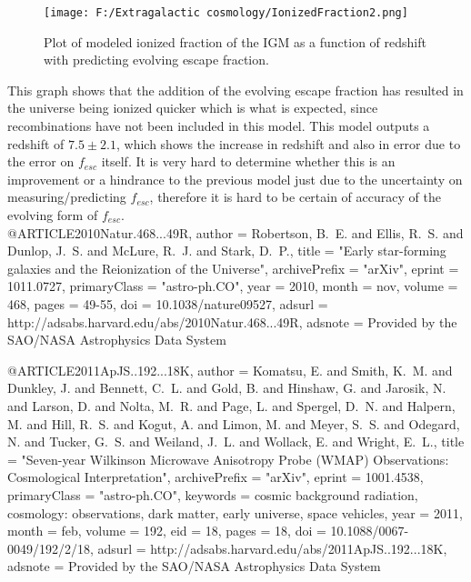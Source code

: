 \documentclass{article}
\begin{document}
\begin{figure}
	\centering
		\texttt{[image: F:/Extragalactic cosmology/IonizedFraction2.png]}
		\caption{Plot of modeled ionized fraction of the IGM as a function of redshift with predicting evolving escape fraction.} 
	\label{fig:IonizedFraction2}
\end{figure}

This graph shows that the addition of the evolving escape fraction has resulted in the universe being ionized quicker which is what is expected, since recombinations have not been included in this model. This model outputs a redshift of $7.5\pm2.1$, which shows the increase in redshift and also in error due to the error on $f_{esc}$ itself. It is very hard to determine whether this is an improvement or a hindrance to the previous model just due to the uncertainty on measuring/predicting $f_{esc}$, therefore it is hard to be certain of accuracy of the evolving form of $f_{esc}$.\\


@ARTICLE{2010Natur.468...49R,
   author = {{Robertson}, B.~E. and {Ellis}, R.~S. and {Dunlop}, J.~S. and 
	{McLure}, R.~J. and {Stark}, D.~P.},
    title = "{Early star-forming galaxies and the Reionization of the Universe}",
archivePrefix = "arXiv",
   eprint = {1011.0727},
 primaryClass = "astro-ph.CO",
     year = 2010,
    month = nov,
   volume = 468,
    pages = {49-55},
      doi = {10.1038/nature09527},
   adsurl = {http://adsabs.harvard.edu/abs/2010Natur.468...49R},
  adsnote = {Provided by the SAO/NASA Astrophysics Data System}
}

@ARTICLE{2011ApJS..192...18K,
   author = {{Komatsu}, E. and {Smith}, K.~M. and {Dunkley}, J. and {Bennett}, C.~L. and 
	{Gold}, B. and {Hinshaw}, G. and {Jarosik}, N. and {Larson}, D. and 
	{Nolta}, M.~R. and {Page}, L. and {Spergel}, D.~N. and {Halpern}, M. and 
	{Hill}, R.~S. and {Kogut}, A. and {Limon}, M. and {Meyer}, S.~S. and 
	{Odegard}, N. and {Tucker}, G.~S. and {Weiland}, J.~L. and {Wollack}, E. and 
	{Wright}, E.~L.},
    title = "{Seven-year Wilkinson Microwave Anisotropy Probe (WMAP) Observations: Cosmological Interpretation}",
archivePrefix = "arXiv",
   eprint = {1001.4538},
 primaryClass = "astro-ph.CO",
 keywords = {cosmic background radiation, cosmology: observations, dark matter, early universe, space vehicles},
     year = 2011,
    month = feb,
   volume = 192,
      eid = {18},
    pages = {18},
      doi = {10.1088/0067-0049/192/2/18},
   adsurl = {http://adsabs.harvard.edu/abs/2011ApJS..192...18K},
  adsnote = {Provided by the SAO/NASA Astrophysics Data System}
}
\end{document}
